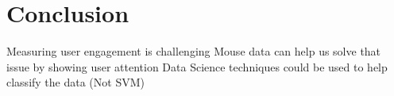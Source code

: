 \documentclass{article}
\begin{document}

\section{Conclusion}

Measuring user engagement is challenging
Mouse data can help us solve that issue by showing user attention
Data Science techniques could be used to help classify the data (Not SVM)


\printbibliography
\end{document}
